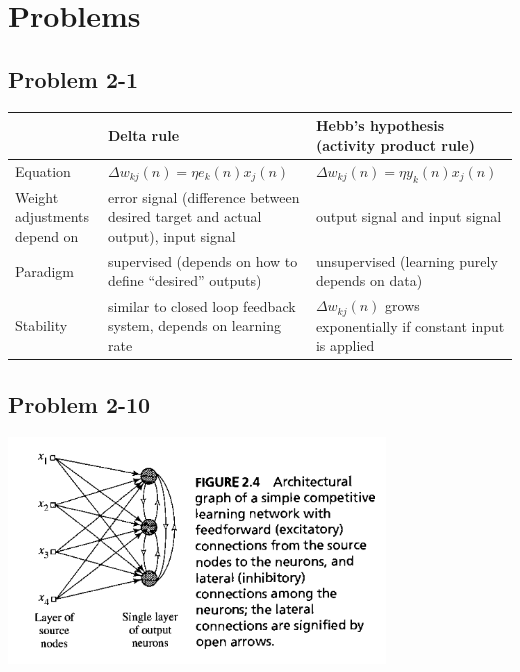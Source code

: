 \documentclass[paper=a4, fontsize=11pt]{scrartcl} %
\title{\hmwkClass \\
       \hmwkTitle}
\author{\hmwkAuthorFullName}
\date{\hmwkDueDate}
\begin{document}
    \maketitle
    \thispagestyle{fancy} %

    \section*{Problems}

    \subsection*{Problem 2-1}
    {
    \def\arraystretch{1.5}
    \begin{tabular}{| p{3.5cm} | p{5.5cm} | p{5.5cm} |}
        \hline
                    & Delta rule & Hebb's hypothesis (activity product rule) \\
        \hline
        Equation    & $ \Delta w_{kj}(n) = \eta e_k(n) x_j(n) $ & $ \Delta w_{kj}(n) = \eta y_k(n) x_j(n) $ \\
        Weight adjustments depend on
                    & error signal (difference between desired target and actual output), input signal
                    & output signal and input signal \\
        Paradigm    & supervised (depends on how to define ``desired'' outputs)
                    & unsupervised (learning purely depends on data) \\
        Stability   & similar to closed loop feedback system, depends on learning rate
                    & $\Delta w_{kj}(n)$ grows exponentially if constant input is applied \\
        \hline
    \end{tabular}
    }

    \subsection*{Problem 2-10}

    \begin{center}
    \setlength{\fboxsep}{0.5pt} %
    \setlength{\fboxrule}{0.5pt} %
    \includegraphics[width=10.0cm]{../images/Haykin-NN-figure2-4.png} %
    \end{center}
\end{document}

